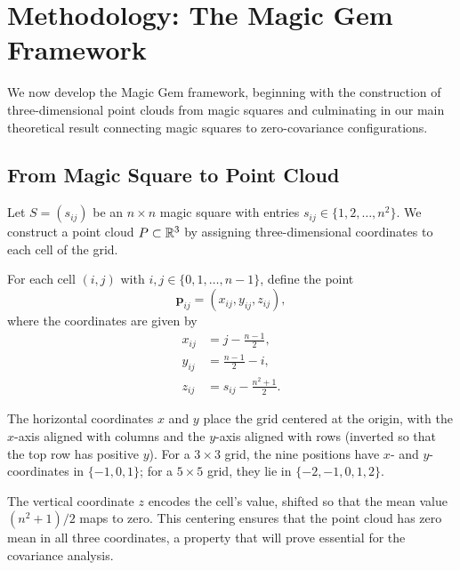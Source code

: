 \section{Methodology: The Magic Gem Framework}
\label{sec:methodology}

We now develop the Magic Gem framework, beginning with the construction of three-dimensional point clouds 
from magic squares and culminating in our main theoretical result connecting magic squares to zero-covariance configurations.

\subsection{From Magic Square to Point Cloud}

Let $S = (s_{ij})$ be an $n \times n$ magic square with entries $s_{ij} \in \{1, 2, \ldots, n^2\}$.
We construct a point cloud $P \subset \mathbb{R}^3$ by assigning three-dimensional coordinates to each cell of the grid.

\begin{definition}
\label{def:gem_coords}
For each cell $(i, j)$ with $i, j \in \{0, 1, \ldots, n-1\}$, define the point
\begin{equation}
\mathbf{p}_{ij} = \left( x_{ij}, y_{ij}, z_{ij} \right),
\end{equation}
where the coordinates are given by
\begin{align}
x_{ij} &= j - \frac{n-1}{2}, \label{eq:x_coord} \\
y_{ij} &= \frac{n-1}{2} - i, \label{eq:y_coord} \\
z_{ij} &= s_{ij} - \frac{n^2 + 1}{2}. \label{eq:z_coord}
\end{align}
\end{definition}

The horizontal coordinates $x$ and $y$ place the grid centered at the origin,
with the $x$-axis aligned with columns and the $y$-axis aligned with rows (inverted so that the top row has positive $y$).
For a $3 \times 3$ grid, the nine positions have $x$- and $y$-coordinates in $\{-1, 0, 1\}$;
for a $5 \times 5$ grid, they lie in $\{-2, -1, 0, 1, 2\}$.

The vertical coordinate $z$ encodes the cell's value, shifted so that the mean value $(n^2 + 1)/2$ maps to zero.
This centering ensures that the point cloud has zero mean in all three coordinates,
a property that will prove essential for the covariance analysis.

